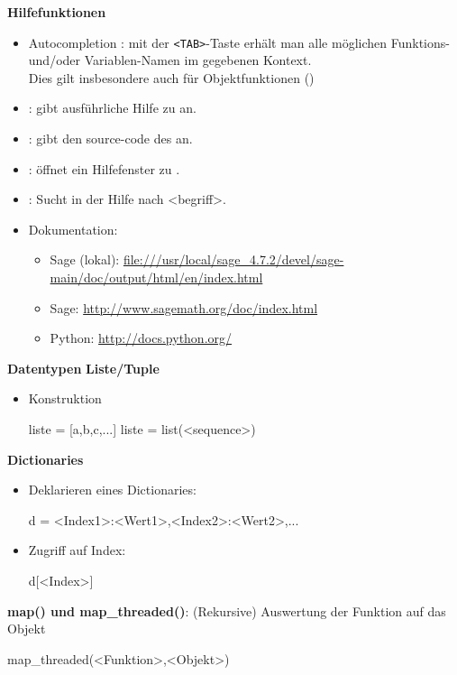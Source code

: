 \documentclass[a4paper,9pt,DIV15,twocolumn]{scrartcl}
\begin{document}
\textbf{Hilfefunktionen}
\begin{itemize}
\item {\color{blue} Autocompletion :} mit der {\color{blue} \verb~<TAB>~}-Taste erhält man alle möglichen Funktions- und/oder Variablen-Namen im gegebenen Kontext.\\
Dies gilt insbesondere auch für Objektfunktionen ()
\item {\color{blue}  :} gibt ausführliche Hilfe zu  an.
\item {\color{blue}  :} gibt den source-code des  an.
\item {\color{blue}  :} öffnet ein Hilfefenster zu .
\item {\color{blue}  :} Sucht in der Hilfe nach <begriff>.
\item Dokumentation:
\begin{itemize}
\item Sage (lokal): \url{file:///usr/local/sage_4.7.2/devel/sage-main/doc/output/html/en/index.html}
\item Sage: \url{http://www.sagemath.org/doc/index.html}
\item Python: \url{http://docs.python.org/}
\end{itemize}
\end{itemize}

\textbf{Datentypen}
\textbf{Liste/Tuple}
\begin{itemize}
 \item Konstruktion
\begin{sagein}
liste = [a,b,c,...] 
liste = list(<sequence>)
\end{sagein}
\end{itemize}

\textbf{Dictionaries}
\begin{itemize}
 \item Deklarieren eines Dictionaries:
\begin{sagein}
d = {<Index1>:<Wert1>,<Index2>:<Wert2>,...}
\end{sagein}
 \item Zugriff auf Index:
\begin{sagein}
d[<Index>]
\end{sagein}
\end{itemize}

\textbf{map() und map\_threaded()}:
(Rekursive) Auswertung der Funktion auf das Objekt
\begin{sagein}
 map_threaded(<Funktion>,<Objekt>)
\end{sagein}
\end{document}
